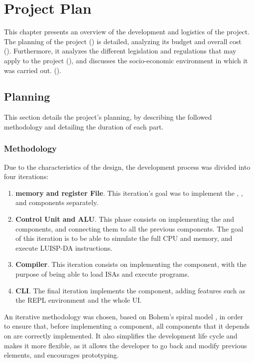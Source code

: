 \chapter{Project Plan}\label{chap:planning}
This chapter presents an overview of the development and logistics of the project. The planning of the project () is detailed, analyzing its budget and overall cost (). Furthermore, it analyzes the different legislation and regulations that may apply to the project (), and discusses the socio-economic environment in which it was carried out. ().


\section{Planning}\label{sec:planning}
This section details the project's planning, by describing the followed methodology and detailing the duration of each part.

\subsection{Methodology}
Due to the characteristics of the design, the development process was divided into four iterations:
\begin{enumerate}[label=\Roman*.]
  \item \textbf{\Gls{memory} and \Gls{register} File}. This iteration's goal was to implement the , , and  components separately.
  \item \textbf{Control Unit and \gls{ALU}}. This phase consists on implementing the  and  components, and connecting them to all the previous components. The goal of this iteration is to be able to simulate the full \gls{CPU} and \gls{memory}, and execute LUISP-DA instructions.
  \item \textbf{Compiler}. This iteration consists on implementing the  component, with the purpose of being able to load \glspl{ISA} and execute programs.
  \item \textbf{\gls{CLI}}. The final iteration implements the  component, adding features such as the \gls{REPL environment} and the whole \gls{UI}.
\end{enumerate}

An iterative methodology was chosen, based on Bohem's spiral model \parencite{BohemBSpiral}, in order to ensure that, before implementing a component, all components that it depends on are correctly implemented. It also simplifies the development life cycle and makes it more flexible, as it allows the developer to go back and modify previous elements, and encourages prototyping.

